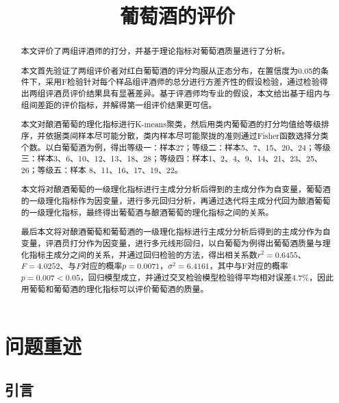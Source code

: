 \documentclass[withoutpreface,bwprint]{cumcmthesis} %
\title{葡萄酒的评价}
\begin{document}
 \maketitle
\begin{abstract}
\par 本文评价了两组评酒师的打分，并基于理论指标对葡萄酒质量进行了分析。
\par 本文首先验证了两组评价者对红白葡萄酒的评分均服从正态分布，在置信度为0.05的条件下，采用F检验针对每个样品组评酒师的总分进行方差齐性的假设检验，通过检验得出两组评酒员评价结果具有显著差异。基于评酒师均专业的假设，本文给出基于组内与组间差距的评价指标，并解得第一组评价结果更可信。

\par 本文对酿酒葡萄的理化指标进行K-means聚类，然后用类内葡萄酒的打分均值给等级排序，并依据类间样本尽可能分散，类内样本尽可能聚拢的准则通过Fisher函数选择分类个数。以白葡萄酒为例，得出等级一：样本27；等级二：样本5、7、15、20、24；等级三：样本3、6、10、12、13、18、28；等级四：样本1、2、4、9、14、21、23、25、26；等级五：样本 8、11、16、17、19、22。  

\par  本文将对酿酒葡萄的一级理化指标进行主成分分析后得到的主成分作为自变量，葡萄酒的一级理化指标作为因变量，进行多元回归分析，再通过迭代将主成分代回为酿酒葡萄的一级理化指标，最终得出葡萄酒与酿酒葡萄的理化指标之间的关系。

\par 最后本文将对酿酒葡萄和葡萄酒的一级理化指标进行主成分分析后得到的主成分作为自变量，评酒员打分作为因变量，进行多元线形回归，以白葡萄为例得出葡萄酒质量与理化指标主成分之间的关系，并通过回归检验的方法，得出相关系数$r^2=0.6455$、$F=4.0252$、与$F$对应的概率$p=0.0071$，$\sigma^2=6.4161$，其中与F对应的概率$p=0.007<0.05$，回归模型成立，并通过交叉检验模型检验得平均相对误差4.7\%，因此用葡萄和葡萄酒的理化指标可以评价葡萄酒的质量。
 
\end{abstract}
\tableofcontents
\newpage

\section{问题重述}

\subsection{引言}
\end{document}
